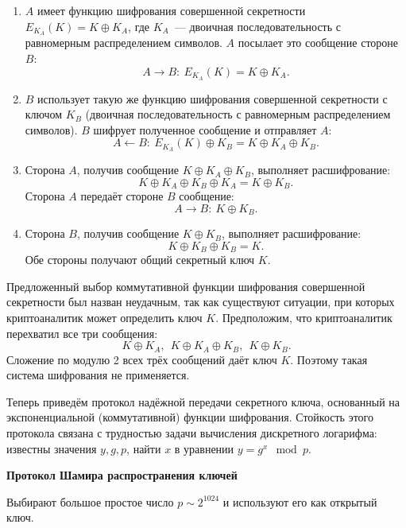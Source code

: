 \begin{enumerate}
    \item $A$ имеет функцию шифрования совершенной секретности $E_{K_A}(K) = K \oplus K_A$, где $K_A$~--- двоичная последовательность с равномерным распределением символов. $A$ посылает это сообщение стороне $B$:
            \[ A \rightarrow B: ~ E_{K_A}(K) = K \oplus K_A. \]
    \item $B$ использует такую же функцию шифрования совершенной секретности с ключом $K_B$ (двоичная последовательность с равномерным распределением символов). $B$ шифрует полученное сообщение и отправляет $A$:
            \[ A \leftarrow B: ~ E_{K_A}(K) \oplus K_B = K \oplus K_A \oplus K_B. \]
    \item Сторона $A$, получив сообщение $K \oplus K_A \oplus K_B$, выполняет расшифрование:
            \[ K \oplus K_A \oplus K_B \oplus K_A = K \oplus K_B. \]
        Сторона $A$ передаёт стороне $B$ сообщение:
            \[ A \rightarrow B: ~ K \oplus K_B. \]
    \item Сторона $B$, получив сообщение $K \oplus K_B$, выполняет расшифрование:
            \[ K \oplus K_B \oplus K_B = K. \]
        Обе стороны получают общий секретный ключ $K$.
\end{enumerate}

Предложенный выбор коммутативной функции шифрования совершенной секретности был назван неудачным, так как существуют ситуации, при которых криптоаналитик может определить ключ $K$. Предположим, что криптоаналитик перехватил все три сообщения:
    \[ K \oplus K_A, ~~ K \oplus K_A \oplus K_B, ~~ K \oplus K_B. \]
Сложение по модулю 2 всех трёх сообщений даёт ключ $K$. Поэтому такая система шифрования не применяется.

Теперь приведём протокол надёжной передачи секретного ключа, основанный на экспоненциальной (коммутативной) функции шифрования. Стойкость этого протокола связана с трудностью задачи вычисления дискретного логарифма: известны значения $y, g, p$, найти $x$ в уравнении $y = g^x \mod p$.

\textbf{Протокол Шамира распространения ключей}

Выбирают большое простое число $p\sim 2^{1024}$ и используют его как открытый ключ.

